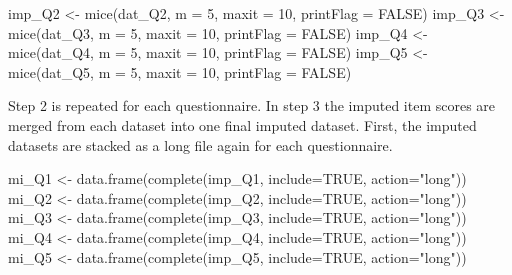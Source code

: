 \documentclass[
]{book}
\newenvironment{Shaded}{\begin{snugshade}}{\end{snugshade}}
\newcommand{\AttributeTok}[1]{\textcolor[rgb]{0.77,0.63,0.00}{#1}}
\newcommand{\ConstantTok}[1]{\textcolor[rgb]{0.00,0.00,0.00}{#1}}
\newcommand{\DecValTok}[1]{\textcolor[rgb]{0.00,0.00,0.81}{#1}}
\newcommand{\FunctionTok}[1]{\textcolor[rgb]{0.00,0.00,0.00}{#1}}
\newcommand{\NormalTok}[1]{#1}
\newcommand{\OtherTok}[1]{\textcolor[rgb]{0.56,0.35,0.01}{#1}}
\newcommand{\StringTok}[1]{\textcolor[rgb]{0.31,0.60,0.02}{#1}}
\begin{document}
\begin{Shaded}
\begin{Highlighting}[]
\NormalTok{imp\_Q2 }\OtherTok{\textless{}{-}} \FunctionTok{mice}\NormalTok{(dat\_Q2, }\AttributeTok{m =} \DecValTok{5}\NormalTok{, }\AttributeTok{maxit =} \DecValTok{10}\NormalTok{, }\AttributeTok{printFlag =} \ConstantTok{FALSE}\NormalTok{)}
\NormalTok{imp\_Q3 }\OtherTok{\textless{}{-}} \FunctionTok{mice}\NormalTok{(dat\_Q3, }\AttributeTok{m =} \DecValTok{5}\NormalTok{, }\AttributeTok{maxit =} \DecValTok{10}\NormalTok{, }\AttributeTok{printFlag =} \ConstantTok{FALSE}\NormalTok{)}
\NormalTok{imp\_Q4 }\OtherTok{\textless{}{-}} \FunctionTok{mice}\NormalTok{(dat\_Q4, }\AttributeTok{m =} \DecValTok{5}\NormalTok{, }\AttributeTok{maxit =} \DecValTok{10}\NormalTok{, }\AttributeTok{printFlag =} \ConstantTok{FALSE}\NormalTok{)}
\NormalTok{imp\_Q5 }\OtherTok{\textless{}{-}} \FunctionTok{mice}\NormalTok{(dat\_Q5, }\AttributeTok{m =} \DecValTok{5}\NormalTok{, }\AttributeTok{maxit =} \DecValTok{10}\NormalTok{, }\AttributeTok{printFlag =} \ConstantTok{FALSE}\NormalTok{)}
\end{Highlighting}
\end{Shaded}

Step 2 is repeated for each questionnaire. In step 3 the imputed item scores are merged from each dataset into one final imputed dataset. First, the imputed datasets are stacked as a long file again for each questionnaire.

\begin{Shaded}
\begin{Highlighting}[]
\NormalTok{mi\_Q1 }\OtherTok{\textless{}{-}} \FunctionTok{data.frame}\NormalTok{(}\FunctionTok{complete}\NormalTok{(imp\_Q1, }\AttributeTok{include=}\ConstantTok{TRUE}\NormalTok{, }\AttributeTok{action=}\StringTok{"long"}\NormalTok{))}
\NormalTok{mi\_Q2 }\OtherTok{\textless{}{-}} \FunctionTok{data.frame}\NormalTok{(}\FunctionTok{complete}\NormalTok{(imp\_Q2, }\AttributeTok{include=}\ConstantTok{TRUE}\NormalTok{, }\AttributeTok{action=}\StringTok{"long"}\NormalTok{))}
\NormalTok{mi\_Q3 }\OtherTok{\textless{}{-}} \FunctionTok{data.frame}\NormalTok{(}\FunctionTok{complete}\NormalTok{(imp\_Q3, }\AttributeTok{include=}\ConstantTok{TRUE}\NormalTok{, }\AttributeTok{action=}\StringTok{"long"}\NormalTok{))}
\NormalTok{mi\_Q4 }\OtherTok{\textless{}{-}} \FunctionTok{data.frame}\NormalTok{(}\FunctionTok{complete}\NormalTok{(imp\_Q4, }\AttributeTok{include=}\ConstantTok{TRUE}\NormalTok{, }\AttributeTok{action=}\StringTok{"long"}\NormalTok{))}
\NormalTok{mi\_Q5 }\OtherTok{\textless{}{-}} \FunctionTok{data.frame}\NormalTok{(}\FunctionTok{complete}\NormalTok{(imp\_Q5, }\AttributeTok{include=}\ConstantTok{TRUE}\NormalTok{, }\AttributeTok{action=}\StringTok{"long"}\NormalTok{))}
\end{Highlighting}
\end{Shaded}
\end{document}
